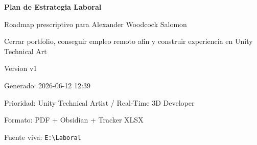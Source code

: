\documentclass[10pt,openany]{book}
\begin{document}
\pagecolor{SoftAccent}
\thispagestyle{empty}
\begin{center}
\vspace*{1.4cm}
{\Huge\bfseries\textcolor{Accent}{Plan de Estrategia Laboral}\par}
\vspace{0.35cm}
{\LARGE Roadmap prescriptivo para Alexander Woodcock Salomon\par}
\vspace{0.9cm}
{\Large Cerrar portfolio, conseguir empleo remoto afin y construir experiencia en Unity Technical Art\par}
\vspace{1cm}
{\large Version v1\par}
{\large Generado: 2026-06-12 12:39\par}
\vfill
{\large Prioridad: Unity Technical Artist / Real-Time 3D Developer\par}
{\small Formato: PDF + Obsidian + Tracker XLSX\par}
\vspace{0.6cm}
{\small Fuente viva: \texttt{E:\textbackslash{}Laboral}\par}
\end{center}
\clearpage
\nopagecolor

\tableofcontents
\clearpage
























\end{document}
